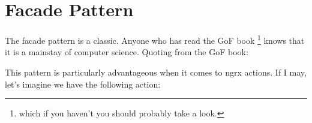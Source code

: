 \maketitle{}
\section{ Facade Pattern }

The facade pattern is a classic. Anyone who has read the GoF book \footnote{
which if you haven't you should probably take a look.} knows that it is a
mainstay of computer science. Quoting from the GoF book:


This pattern is particularly advantageous when it comes to ngrx actions. If I
may, let's imagine we have the following action:
